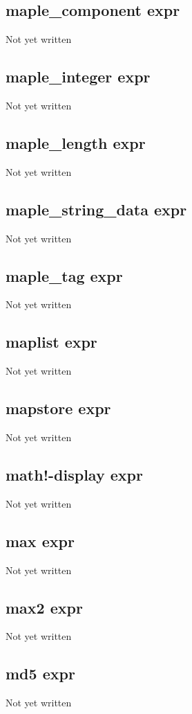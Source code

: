 \documentclass[a4paper,11pt]{article}
\begin{document}
{\subsection{\ttfamily maple\_component expr}
   Not yet written

\subsection{\ttfamily maple\_integer expr}
   Not yet written

\subsection{\ttfamily maple\_length expr}
   Not yet written

\subsection{\ttfamily maple\_string\_data expr}
   Not yet written

\subsection{\ttfamily maple\_tag expr}
   Not yet written

\subsection{\ttfamily maplist expr}
   Not yet written

\subsection{\ttfamily mapstore expr}
   Not yet written

\subsection{\ttfamily math!-display expr}
   Not yet written

\subsection{\ttfamily max expr}
   Not yet written

\subsection{\ttfamily max2 expr}
   Not yet written

\subsection{\ttfamily md5 expr}
   Not yet written

}
\end{document}
